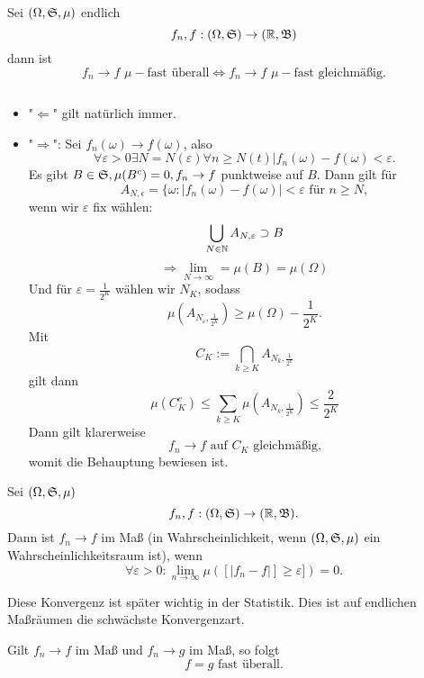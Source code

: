 			\begin{satz}
				Sei $(\Omega,\mathfrak{S},\mu)$ endlich
				\[ f_n,f:(\Omega,\mathfrak{S})\to(\mathbb{R},\mathfrak{B}) \]
				dann ist
				\[ f_n\to f\,\,\mu-\text{fast überall}\Leftrightarrow f_n\to f\,\,\mu-\text{fast gleichmäßig.} \]
			\end{satz}
			
			\begin{bew}$ $
				\begin{itemize}
					\item "$\Leftarrow$" gilt natürlich immer.
					\item "$\Rightarrow$":\newline
					Sei $f_n(\omega)\to f(\omega)$, also
					\[ \forall \varepsilon>0\exists N=N(\varepsilon)\forall n\ge N(t) |f_n(\omega)-f(\omega)<\varepsilon. \]
					Es gibt $B\in\mathfrak{S}, \mu(B^c)=0, f_n\to f$ punktweise auf $B$. Dann gilt für
					\[ A_{N,\epsilon}=\{\omega:|f_n(\omega)-f(\omega)|<\varepsilon \text{ für }n\ge N, \]
					wenn wir $\varepsilon$ fix wählen:
					\[ \bigcup_{N\in\mathbb{N}}A_{N,\varepsilon}\supset B \]
					\[ \Rightarrow \lim_{N\to\infty}=\mu(B)=\mu(\Omega) \]
					Und für $\varepsilon=\frac{1}{2^K}$ wählen wir $N_K$, sodass
					\[ \mu(A_{N_\varepsilon,\frac{1}{2^K}})\ge\mu(\Omega)-\frac{1}{2^K}. \]
					Mit 
					\[ C_K:=\bigcap_{k\ge K} A_{N_k,\frac{1}{2^k}} \]
					gilt dann
					\[ \mu(C_K^c)\le\sum_{k\ge K}\mu(A_{N_k,\frac{1}{2^K}})\le \frac{2}{2^K} \]
					Dann gilt klarerweise
					\[ f_n\to f\text{ auf }C_K\text{ gleichmäßig,} \]
					womit die Behauptung bewiesen ist. 
				\end{itemize}
			\end{bew}
			
			\begin{defi}
				Sei $(\Omega,\mathfrak{S},\mu)$
				\[ f_n,f: (\Omega,\mathfrak{S})\to(\mathbb{R},\mathfrak{B}). \]
				Dann ist $f_n\to f$ im Maß (in Wahrscheinlichkeit, wenn $(\Omega, \mathfrak{S},\mu)$ ein Wahrscheinlichkeitsraum ist), wenn
				\[ \forall \varepsilon>0: \lim_{n\to\infty}\mu([|f_n-f|]\ge\varepsilon])=0. \]
			\end{defi}
			
			\begin{bem}
				Diese Konvergenz ist später wichtig in der Statistik. Dies ist auf endlichen Maßräumen die schwächste Konvergenzart. 
			\end{bem}
			
			\begin{satz}
				Gilt $f_n\to f$ im Maß und $f_n\to g$ im Maß, so folgt
				\[ f=g \text{ fast überall}. \]
			\end{satz}
			
